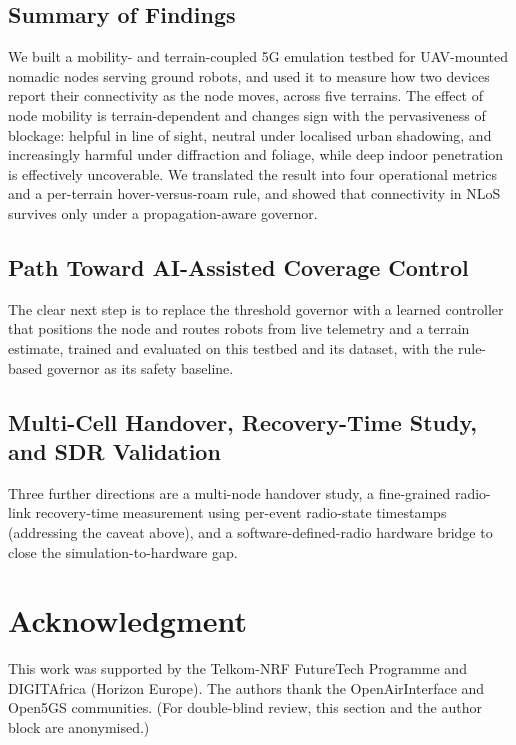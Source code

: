 \documentclass[conference]{IEEEtran}
\begin{document}
\subsection{Summary of Findings}
We built a mobility- and terrain-coupled 5G emulation testbed for UAV-mounted nomadic
nodes serving ground robots, and used it to measure how two devices report their
connectivity as the node moves, across five terrains. The effect of node mobility is
terrain-dependent and changes sign with the pervasiveness of blockage: helpful in line
of sight, neutral under localised urban shadowing, and increasingly harmful under
diffraction and foliage, while deep indoor penetration is effectively uncoverable. We
translated the result into four operational metrics and a per-terrain hover-versus-roam
rule, and showed that connectivity in NLoS survives only under a propagation-aware
governor.

\subsection{Path Toward AI-Assisted Coverage Control}
The clear next step is to replace the threshold governor with a learned controller that
positions the node and routes robots from live telemetry and a terrain estimate,
trained and evaluated on this testbed and its dataset, with the rule-based governor as
its safety baseline.

\subsection{Multi-Cell Handover, Recovery-Time Study, and SDR Validation}
Three further directions are a multi-node handover study, a fine-grained
radio-link recovery-time measurement using per-event radio-state timestamps (addressing
the caveat above), and a software-defined-radio hardware bridge to close the
simulation-to-hardware gap.

\section*{Acknowledgment}
This work was supported by the Telkom-NRF FutureTech Programme and DIGITAfrica
(Horizon Europe). The authors thank the OpenAirInterface and Open5GS communities.
(For double-blind review, this section and the author block are anonymised.)
\end{document}
